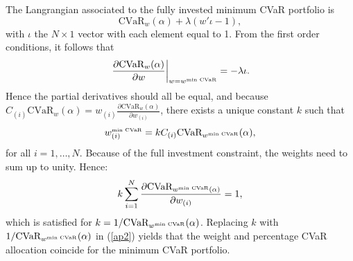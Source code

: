 \documentclass[12pt,a4paper]{article}
\begin{document}
The Langrangian associated to the fully invested minimum CVaR portfolio is 
\begin{equation}  \mbox{CVaR}_w(\alpha) + \lambda ( w'\iota - 1 ),\end{equation}
with $\iota$ the $N\times 1$ vector with each element equal to 1. 
From the first order conditions, it follows that 
\begin{equation}  \left.\frac{ \partial \mbox{CVaR}_w(\alpha)}{\partial w}\right|_{w=w^{\mbox{\tiny min CVaR}}} = -\lambda \iota. \label{ap1}\end{equation}
Hence the partial derivatives should all be equal, and because $C_{(i)} \mbox{CVaR}_w(\alpha)= w_{(i)}\frac{ \partial \mbox{CVaR}_w(\alpha)}{\partial w_{(i)}} $, there exists a unique constant $k$ such that
\begin{equation} w_{(i)}^{\mbox{\tiny min CVaR}} = k C_{(i)} \mbox{CVaR}_{w^{\mbox{\tiny min CVaR}}}(\alpha), \label{ap2}\end{equation} for all $i=1,\ldots,N$.
Because of the full investment constraint, the weights need to sum up to unity. Hence: 
 \begin{equation} k \sum_{i=1}^N \frac{ \partial \mbox{CVaR}_{w^{\mbox{\tiny min CVaR}}(\alpha)}}{\partial w_{(i)}} = 1, \label{ap3}\end{equation}
which is satisfied for $k=1/\mbox{CVaR}_{w^{\mbox{\tiny min CVaR}}}(\alpha)$. Replacing $k$ with $1/\mbox{CVaR}_{w^{\mbox{\tiny min CVaR}}}(\alpha)$ in (\ref{ap2}) yields that the weight and percentage CVaR allocation coincide for the minimum CVaR portfolio.
 



\end{document}
